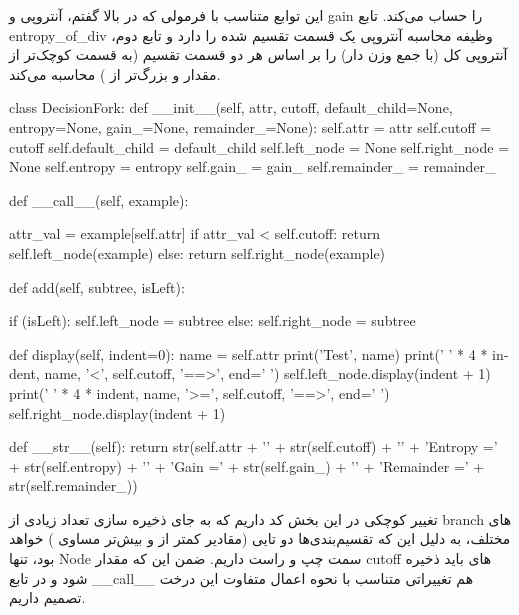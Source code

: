 \documentclass[12pt,titlepage,a4page , tikz , multi,table , svgnames,xcdraw]{article}
\begin{document}
این توابع متناسب با فرمولی که در بالا گفتم، آنتروپی و gain را حساب می‌کند. تابع entropy\_of\_div وظیفه محاسبه آنتروپی یک قسمت تقسیم شده را دارد و تابع دوم، آنتروپی کل (با جمع وزن دار) را بر اساس هر دو قسمت تقسیم (به قسمت کوچک‌تر از مقدار  و بزرگ‌تر از ) محاسبه می‌کند.

\newpage

 \begin{latin}
\begin{python}[language=Python]


class DecisionFork:
    def __init__(self, attr, cutoff, default_child=None, entropy=None,
     gain_=None, remainder_=None):
        self.attr = attr
        self.cutoff = cutoff
        self.default_child = default_child
        self.left_node = None
        self.right_node = None
        self.entropy = entropy
        self.gain_ = gain_
        self.remainder_ = remainder_

    def __call__(self, example):

        attr_val = example[self.attr]
        if attr_val < self.cutoff:
            return self.left_node(example)
        else:
            return self.right_node(example)

    def add(self, subtree, isLeft):

        if (isLeft):
            self.left_node = subtree
        else:
            self.right_node = subtree

    def display(self, indent=0):
        name = self.attr
        print('Test', name)
        print(' ' * 4 * indent, name, '<', self.cutoff, '==>', end=' ')
        self.left_node.display(indent + 1)
        print(' ' * 4 * indent, name, '>=', self.cutoff, '==>', end=' ')
        self.right_node.display(indent + 1)

    def __str__(self):
        return str(self.attr + '\n' + str(self.cutoff)
         + '\n' + 'Entropy =' + str(self.entropy) + '\n' + 'Gain =' +
                   str(self.gain_) + '\n' + 'Remainder ='
                    + str(self.remainder_))

\end{python}

\end{latin}

تغییر کوچکی در این بخش کد داریم که به جای ذخیره سازی تعداد زیادی از branch های مختلف، به دلیل این که تقسیم‌بندی‌ها دو تایی (مقادیر کمتر از  و بیش‌تر مساوی ) خواهد بود، تنها Node سمت چپ و راست داریم. ضمن این که مقدار cutoff های باید ذخیره شود و در تابع \_\_call\_\_ هم تغییراتی متناسب با نحوه اعمال متفاوت این درخت تصمیم داریم.
\end{document}
